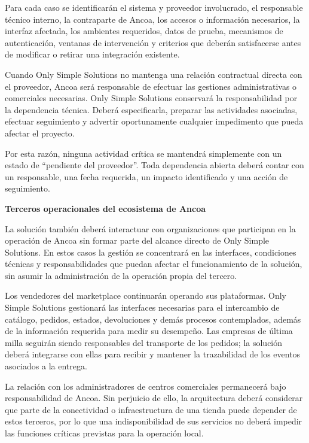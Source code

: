 \documentclass[11pt]{article}
\begin{document}
Para cada caso se identificarán el sistema y proveedor involucrado, el
responsable técnico interno, la contraparte de Ancoa, los accesos o
información necesarios, la interfaz afectada, los ambientes requeridos,
datos de prueba, mecanismos de autenticación, ventanas de intervención y
criterios que deberán satisfacerse antes de modificar o retirar una
integración existente.

Cuando Only Simple Solutions no mantenga una relación contractual
directa con el proveedor, Ancoa será responsable de efectuar las
gestiones administrativas o comerciales necesarias. Only Simple
Solutions conservará la responsabilidad por la dependencia técnica.
Deberá especificarla, preparar las actividades asociadas, efectuar
seguimiento y advertir oportunamente cualquier impedimento que pueda
afectar el proyecto.

Por esta razón, ninguna actividad crítica se mantendrá simplemente con
un estado de ``pendiente del proveedor''. Toda dependencia abierta
deberá contar con un responsable, una fecha requerida, un impacto
identificado y una acción de seguimiento.

\textbf{Terceros operacionales del ecosistema de Ancoa}

La solución también deberá interactuar con organizaciones que participan
en la operación de Ancoa sin formar parte del alcance directo de Only
Simple Solutions. En estos casos la gestión se concentrará en las
interfaces, condiciones técnicas y responsabilidades que puedan afectar
el funcionamiento de la solución, sin asumir la administración de la
operación propia del tercero.

Los vendedores del marketplace continuarán operando sus plataformas.
Only Simple Solutions gestionará las interfaces necesarias para el
intercambio de catálogo, pedidos, estados, devoluciones y demás procesos
contemplados, además de la información requerida para medir su
desempeño. Las empresas de última milla seguirán siendo responsables del
transporte de los pedidos; la solución deberá integrarse con ellas para
recibir y mantener la trazabilidad de los eventos asociados a la
entrega.

La relación con los administradores de centros comerciales permanecerá
bajo responsabilidad de Ancoa. Sin perjuicio de ello, la arquitectura
deberá considerar que parte de la conectividad o infraestructura de una
tienda puede depender de estos terceros, por lo que una indisponibilidad
de sus servicios no deberá impedir las funciones críticas previstas para
la operación local.
\end{document}
